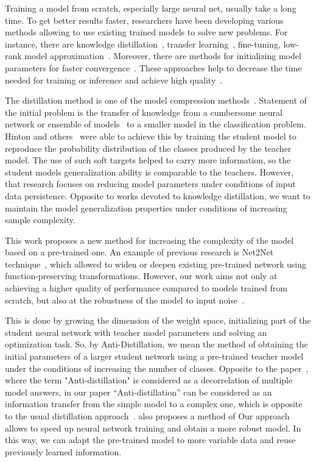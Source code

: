 \documentclass[conference]{IEEEtran}
\begin{document}
Training a model from scratch, especially large neural net, usually take a long time. To get better results faster, researchers have been developing various methods allowing to use existing trained models to solve new problems. For instance, there are knowledge distillation~\cite{hinton2015distilling, lopezpaz2016unifying}, transfer learning~\cite{zhuang2019acomprehensive}, fine-tuning, low-rank model approximation~\cite{yu2017oncompressing}. Moreover, there are methods for initializing model parameters for faster convergence~\cite{glorot2010understanding, Koturwar2017WeightIO}. These approaches help to decrease the time needed for training or inference and achieve high quality~\cite{pmlr-v157-skorski21a}.

The distillation method is one of the model compression methods~\cite{BucilaCN06}. Statement of the initial problem is the transfer of knowledge from a cumbersome neural network or ensemble of models~\cite{Dietterich2000} to a smaller model in the classification problem. Hinton and others~\cite{hinton2015distilling} were able to achieve this by training the student model to reproduce the probability distribution of the classes produced by the teacher model. The use of such soft targets helped to carry more information, so the student models generalization ability is comparable to the teachers. However, that research focuses on reducing model parameters under conditions of input data persistence. Opposite to works devoted to knowledge distillation, we want to maintain the model generalization properties under conditions of increasing sample complexity.

This work proposes a new method for increasing the complexity of the model based on a pre-trained one. An example of previous research is Net2Net technique~\cite{net2net}, which allowed to widen or deepen existing pre-trained network using function-preserving transformations. However, our work aims not only at achieving a higher quality of performance compared to models trained from scratch, but also at the robustness of the model to input noise~\cite{Zheng2020, Han2020}.

This is done by growing the dimension of the weight space, initializing part of the student neural network with teacher model parameters and solving an optimization task. So, by Anti-Distillation, we mean the method of obtaining the initial parameters of a larger student network using a pre-trained teacher model under the conditions of increasing the number of classes. Opposite to the paper~\cite{shamir2020anti}, where the term "Anti-distillation" is considered as a decorrelation of multiple model answers, in our paper ``Anti-distillation'' can be considered as an information transfer from the simple model to a complex one, which is opposite to the usual distillation approach~\cite{hinton2015distilling}.  also proposes a method of Our approach allows to speed up neural network training and obtain a more robust model. In this way, we can adapt the pre-trained model to more variable data and reuse previously learned information. 
\end{document}
